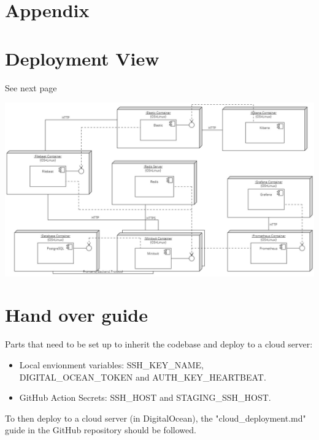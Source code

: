 \pagebreak
\printbibliography


\pagebreak
\section{Appendix}
\appendix


\section{Deployment View}
See next page
\label{appendix:DeploymentView}

\includegraphics[width=1\textwidth]{images/DeploymentView2.0.jpg}
\section{Hand over guide}
\label{appendix:handOverGuide}
Parts that need to be set up to inherit the codebase and deploy to a cloud server:
\begin{itemize}
    \item Local envionment variables: SSH\_KEY\_NAME, DIGITAL\_OCEAN\_TOKEN and AUTH\_KEY\_HEARTBEAT.
    \item GitHub Action Secrets: SSH\_HOST and STAGING\_SSH\_HOST.
\end{itemize}
To then deploy to a cloud server (in DigitalOcean), the "cloud\_deployment.md" guide in the GitHub repository should be followed.

